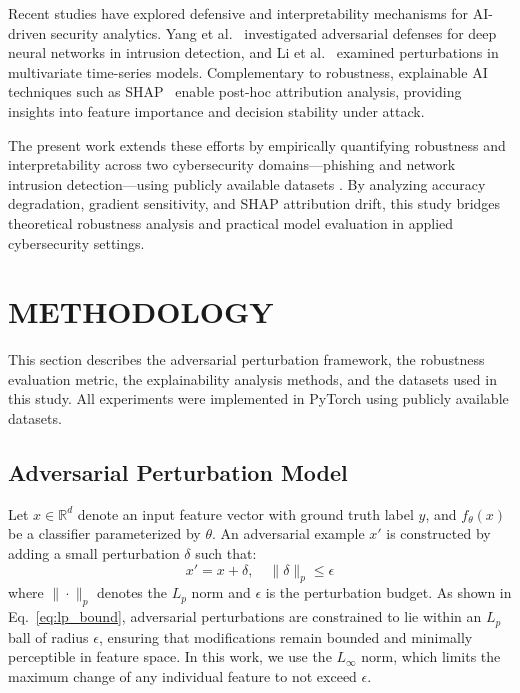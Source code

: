 \documentclass[a4paper,twoside]{article}
\begin{document}
Recent studies have explored defensive and interpretability mechanisms 
for AI-driven security analytics. 
Yang et al.~\cite{yang2020defending} investigated adversarial defenses 
for deep neural networks in intrusion detection, and 
Li et al.~\cite{li2020adversarial} examined perturbations in multivariate 
time-series models. 
Complementary to robustness, explainable AI techniques such as 
SHAP~\cite{lundberg2017unified} enable post-hoc attribution analysis, 
providing insights into feature importance and decision stability under attack.

The present work extends these efforts by empirically quantifying 
robustness and interpretability across two cybersecurity domains---phishing 
and network intrusion detection---using publicly available datasets 
\cite{phishing_kaggle,unsw_kaggle,moustafa2015unsw}. 
By analyzing accuracy degradation, gradient sensitivity, and SHAP attribution drift, 
this study bridges theoretical robustness analysis and practical 
model evaluation in applied cybersecurity settings.

\section{\uppercase{Methodology}}

This section describes the adversarial perturbation framework, the robustness evaluation metric, 
the explainability analysis methods, and the datasets used in this study. 
All experiments were implemented in PyTorch using publicly available datasets.

\subsection{Adversarial Perturbation Model}

Let $x \in \mathbb{R}^d$ denote an input feature vector with ground truth label $y$, 
and $f_\theta(x)$ be a classifier parameterized by $\theta$. 
An adversarial example $x'$ is constructed by adding a small perturbation $\delta$ 
such that:
\begin{equation}
x' = x + \delta, \quad \|\delta\|_p \leq \epsilon
\label{eq:lp_bound}
\end{equation}
where $\|\cdot\|_p$ denotes the $L_p$ norm and $\epsilon$ is the perturbation budget. 
As shown in Eq.~\ref{eq:lp_bound}, adversarial perturbations are constrained to lie within 
an $L_p$ ball of radius $\epsilon$, ensuring that modifications remain bounded 
and minimally perceptible in feature space.
In this work, we use the $L_\infty$ norm, which limits the maximum change of any individual feature 
to not exceed $\epsilon$.
\end{document}
